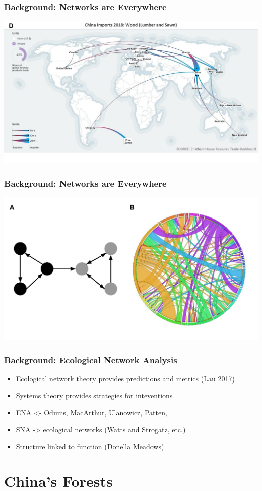 \begin{frame}
  \frametitle{Background: Networks are Everywhere}

\begin{center}\includegraphics[width=0.5\linewidth]{images/resourcetrade_network} \end{center}


\end{frame}


\begin{frame}
  \frametitle{Background: Networks are Everywhere}

\begin{center}\includegraphics[width=0.5\linewidth]{images/example_network} \end{center}

\end{frame}

\begin{frame}
  \frametitle{Background: Ecological Network Analysis}

  \begin{itemize}
\item Ecological network theory provides predictions and metrics (Lau 2017)
\item Systems theory provides strategies for inteventions
\item ENA <- Odums, MacArthur, Ulanowicz, Patten,
\item SNA -> ecological networks (Watts and Strogatz, etc.)
\item Structure linked to function (Donella Meadows)
  \end{itemize}


\section{China's Forests}

\end{frame}

